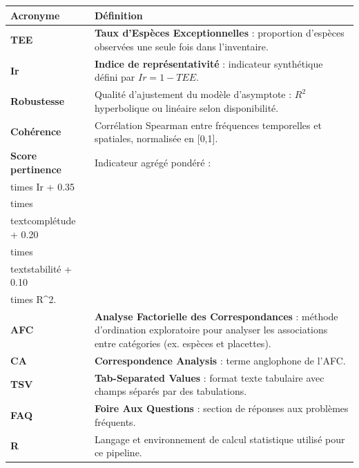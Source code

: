 {\def\LTcaptype{none} %
\begin{longtable}[]{@{}
  >{\raggedright\arraybackslash}p{}
  >{\raggedright\arraybackslash}p{}@{}}
\toprule\noalign{}
\begin{minipage}[b]{\linewidth}\raggedright
Acronyme
\end{minipage} & \begin{minipage}[b]{\linewidth}\raggedright
Définition
\end{minipage} \\
\midrule\noalign{}
\endhead
\bottomrule\noalign{}
\endlastfoot
\textbf{TEE} & \textbf{Taux d'Espèces Exceptionnelles} : proportion
d'espèces observées une seule fois dans l'inventaire. \\
\textbf{Ir} & \textbf{Indice de représentativité} : indicateur
synthétique défini par \(Ir = 1 - TEE\). \\
\textbf{Robustesse} & Qualité d'ajustement du modèle d'asymptote :
\(R^2\) hyperbolique ou linéaire selon disponibilité. \\
\textbf{Cohérence} & Corrélation Spearman entre fréquences temporelles
et spatiales, normalisée en {[}0,1{]}. \\
\textbf{Score pertinence} & Indicateur agrégé pondéré :
\(0.35 \\times Ir + 0.35 \\times \\text{complétude} + 0.20 \\times \\text{stabilité} + 0.10 \\times R^2\). \\
\textbf{AFC} & \textbf{Analyse Factorielle des Correspondances} :
méthode d'ordination exploratoire pour analyser les associations entre
catégories (ex. espèces et placettes). \\
\textbf{CA} & \textbf{Correspondence Analysis} : terme anglophone de
l'AFC. \\
\textbf{TSV} & \textbf{Tab-Separated Values} : format texte tabulaire
avec champs séparés par des tabulations. \\
\textbf{FAQ} & \textbf{Foire Aux Questions} : section de réponses aux
problèmes fréquents. \\
\textbf{R} & Langage et environnement de calcul statistique utilisé pour
ce pipeline. \\
\end{longtable}
}

